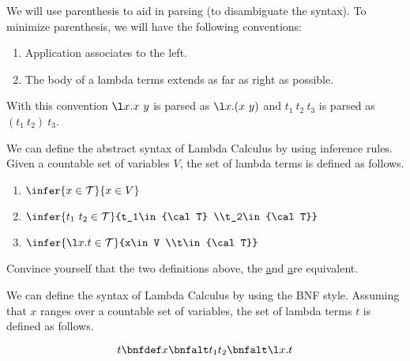 \begin{gram}
\label{grm:lambda::syn::conventions} 
We will use parenthesis to aid in parsing (to disambiguate the
syntax).  To minimize parenthesis, we will have the following
conventions:
\begin{enumerate}
\item Application associates to the left.
\item The body of a lambda terms extends as far as right as possible. 
\end{enumerate}

With this convention $\l x. x~y$ is parsed as $\l x. (x~y)$ and $t_1~
t_2~t_3$ is parsed as $(t_1~t_2)~t_3$.
\end{gram}


\begin{definition}
\label{def:lambda::syn::inference}
We can define the abstract syntax of Lambda Calculus by using inference rules.
%
Given a countable set of variables $V$, the set of lambda terms is
defined as follows.

\begin{enumerate}

\item{$\infer {x\in {\cal T}} {x\in V}$}

\item{$\infer  {t_1~t_2\in {\cal T}} {t_1\in {\cal T} \\t_2\in {\cal T}}$}

\item{$\infer  {\l x.t\in {\cal T}} {x\in V \\t\in {\cal T}}$}
\end{enumerate}

\end{definition}

\begin{exercise}
Convince yourself that the two definitions above, 
%
the  \href{def:lambda::syn::inductive} and \href{def:lambda::syn::inference}
%
are equivalent.
\end{exercise}

\begin{definition}
\label{def:lambda::syn::bnf} 
We can define the syntax of Lambda Calculus by using the BNF style. 
%
Assuming that $x$ ranges over a countable set of variables, the set of
lambda terms $t$ is defined as follows.

\[
t \bnfdef x \bnfalt t_1 t_2 \bnfalt \l x.t
\]
\end{definition}




